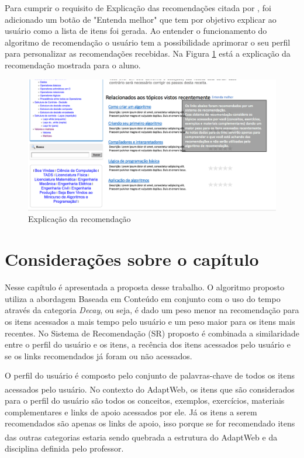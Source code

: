 Para cumprir o requisito de Explicação das recomendações citada por , foi adicionado um
botão de "Entenda melhor" que tem por objetivo explicar ao usuário como a lista de itens foi gerada. Ao entender o
funcionamento do algoritmo de recomendação o usuário tem a possibilidade aprimorar o seu perfil para personalizar as
recomendações recebidas. Na Figura \ref{fig:adaptweb-proposta-explicacao} está a explicação da recomendação mostrada para o aluno.

\begin{figure}[htb]
  \caption{\label{fig:adaptweb-proposta-explicacao}Explicação da recomendação}
  \begin{center}
      \includegraphics[scale=0.6]{./Figuras/explicacoes_v2.png}
  \end{center}
\end{figure}

\section{Considerações sobre o capítulo}

Nesse capítulo é apresentada a proposta desse trabalho. O algoritmo proposto utiliza a abordagem Baseada em Conteúdo em
conjunto com o uso do tempo através da categoria \textit{Decay}, ou seja, é dado um peso menor na recomendação para os
itens acessados a mais tempo pelo usuário e um peso maior para os itens mais recentes. No Sistema de Recomendação (SR)
proposto é combinada a similaridade entre o perfil do usuário e os itens, a recência dos itens acessados pelo usuário e
se os links recomendados já foram ou não acessados.

O perfil do usuário é composto pelo conjunto de palavras-chave de todos os itens acessados pelo usuário. No contexto do
AdaptWeb\textsuperscript{\textregistered}, os itens que são considerados para o perfil do usuário são todos os conceitos,
exemplos, exercícios, materiais complementares e links de apoio acessados por ele. Já os itens a serem recomendados são
apenas os links de apoio, isso porque se for recomendado itens das outras categorias estaria sendo quebrada a estrutura
do AdaptWeb\textsuperscript{\textregistered} e da disciplina definida pelo professor.

